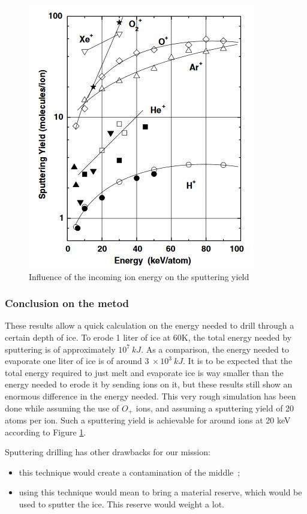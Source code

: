     \begin{figure}[H]		
\begin{center}
\includegraphics{Paul/sputteringenergy.JPG}
\end{center}
\caption{Influence of the incoming ion energy on the sputtering yield}
\label{sputteringenergy}
\end{figure}



\subsubsection{Conclusion on the metod}

These results allow a quick calculation on the energy needed to drill through a certain depth of ice. To erode 1 liter of ice at 60K, the total energy needed by sputtering is of approximately $10^{7}~kJ$. As a comparison, the energy needed to evaporate one liter of ice is of around $3~\times10^{3}~kJ$. It is to be expected that the total energy required to just melt and evaporate ice is way smaller than the energy needed to erode it by sending ions on it, but these results still show an enormous difference in the energy needed. This very rough simulation has been done while assuming the use of $O_{+}$ ions, and assuming a sputtering yield of 20 atoms per ion. Such a sputtering yield is achievable for around ions at 20 keV according to Figure \ref{sputteringenergy}.

Sputtering drilling has other drawbacks for our mission:
\begin{itemize}
\item{this technique would create a contamination of the middle~;}
\item{using this technique would mean to bring a material reserve, which would be used to sputter the ice. This reserve would weight a lot.}
\end{itemize}

